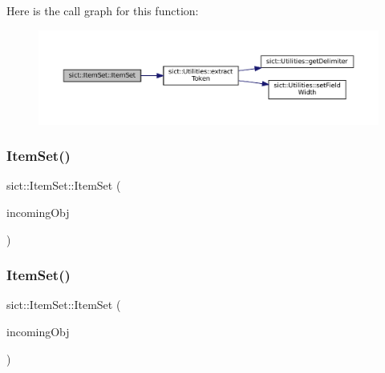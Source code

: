 Here is the call graph for this function\+:
\nopagebreak
\begin{figure}[H]
\begin{center}
\leavevmode
\includegraphics[width=350pt]{classsict_1_1ItemSet_ae90c48652022bb74c04774fe0b59eadc_cgraph}
\end{center}
\end{figure}
\mbox{\label{classsict_1_1ItemSet_ac5814fc09385ea14c8776fd3d9920d16}} 
\subsubsection{\texorpdfstring{ItemSet()}{ItemSet()}\hspace{0.1cm}{\footnotesize\ttfamily [3/4]}}
{\footnotesize\ttfamily sict\+::\+Item\+Set\+::\+Item\+Set (\begin{DoxyParamCaption}\item[{const \mbox{\hyperlink{classsict_1_1ItemSet}{Item\+Set}} \&}]{incoming\+Obj }\end{DoxyParamCaption})\hspace{0.3cm}{\ttfamily [delete]}}

\mbox{\label{classsict_1_1ItemSet_a5efb673bc5cad8a35404fef1dd43a78b}} 
\subsubsection{\texorpdfstring{ItemSet()}{ItemSet()}\hspace{0.1cm}{\footnotesize\ttfamily [4/4]}}
{\footnotesize\ttfamily sict\+::\+Item\+Set\+::\+Item\+Set (\begin{DoxyParamCaption}\item[{\mbox{\hyperlink{classsict_1_1ItemSet}{Item\+Set}} \&\&}]{incoming\+Obj }\end{DoxyParamCaption})}



